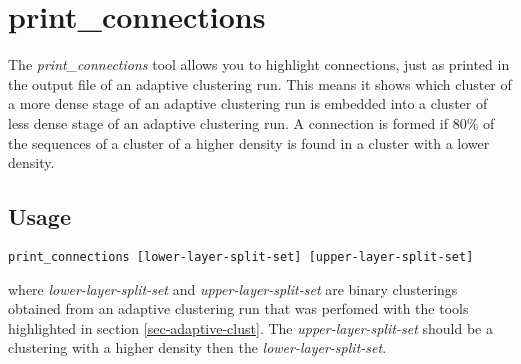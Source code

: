 \section{print\_connections}
The \emph{print\_connections} tool allows you to highlight
connections, just as printed in the output file of an adaptive
clustering run. This means it shows which cluster of a more dense
stage of an adaptive clustering run is embedded into a cluster of less
dense stage of an adaptive clustering run. A connection is formed if
80\% of the sequences of a cluster of a higher density is found in a
cluster with a lower density. 

\subsection{Usage}
\begin{lstlisting}
print_connections [lower-layer-split-set] [upper-layer-split-set]
\end{lstlisting}
where \emph{lower-layer-split-set} and \emph{upper-layer-split-set}
are binary clusterings obtained from an adaptive clustering run that
was perfomed with the tools highlighted in section \ref{sec-adaptive-clust}. The
\emph{upper-layer-split-set} should be a clustering with a higher
density then the \emph{lower-layer-split-set}. 


